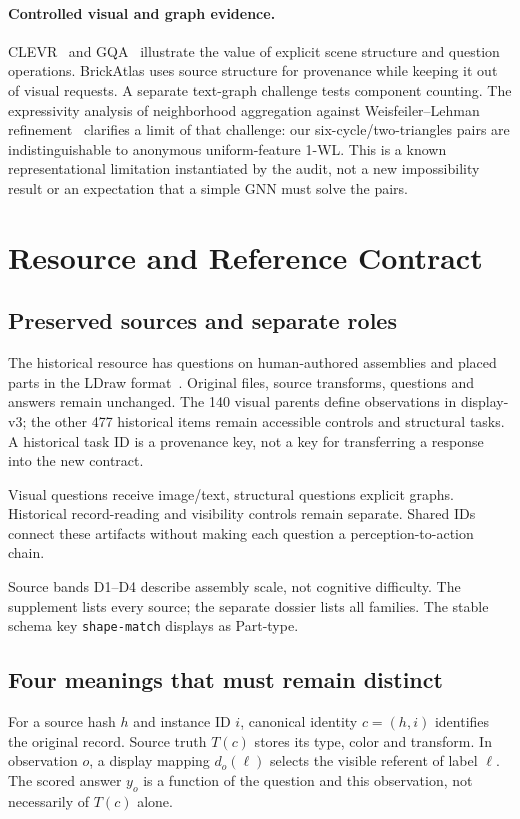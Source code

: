 \documentclass[10pt,twocolumn,letterpaper]{article}
\begin{document}
\paragraph{Controlled visual and graph evidence.}
CLEVR~\cite{johnson2017clevr} and GQA~\cite{hudson2019gqa} illustrate
the value of explicit scene structure and question operations.
BrickAtlas uses source structure for provenance while keeping it out
of visual requests. A separate text-graph challenge tests component
counting. The expressivity analysis of neighborhood aggregation
against Weisfeiler--Lehman refinement~\cite{xu2019gnn} clarifies a
limit of that challenge: our six-cycle/two-triangles pairs are
indistinguishable to anonymous uniform-feature 1-WL. This is a
known representational limitation instantiated by the audit, not a
new impossibility result or an expectation that a simple GNN must
solve the pairs.

\section{Resource and Reference Contract}
\subsection{Preserved sources and separate roles}
The historical resource has \EvTasks{} questions on \EvSources{}
human-authored assemblies and \EvParts{} placed parts in the LDraw
format~\cite{ldraw}. Original files, source transforms, questions and
answers remain unchanged. The 140 visual parents define observations in
display-v3; the other 477 historical items remain accessible controls
and structural tasks. A historical task ID is a provenance key, not
a key for transferring a response into the new contract.

Visual questions receive image/text, structural questions explicit graphs.
Historical record-reading and visibility controls remain separate.
Shared IDs connect these artifacts without making each question a
perception-to-action chain.

Source bands D1--D4 describe assembly scale, not cognitive difficulty.
The supplement lists every source; the separate dossier lists all families.
The stable schema key \texttt{shape-match} displays as Part-type.

\subsection{Four meanings that must remain distinct}
For a source hash $h$ and instance ID $i$, canonical identity
$c=(h,i)$ identifies the original record. Source truth $T(c)$ stores
its type, color and transform. In observation $o$, a display mapping
$d_o(\ell)$ selects the visible referent of label $\ell$. The scored
answer $y_o$ is a function of the question and this observation,
not necessarily of $T(c)$ alone.
\end{document}
